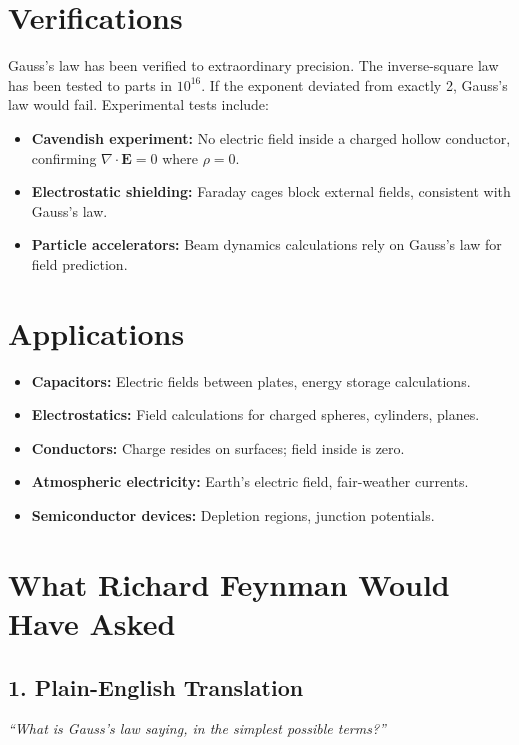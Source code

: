 \section*{Verifications}

Gauss's law has been verified to extraordinary precision. The inverse-square law has been tested to parts in $10^{16}$. If the exponent deviated from exactly 2, Gauss's law would fail. Experimental tests include:

\begin{itemize}
\item \textbf{Cavendish experiment:} No electric field inside a charged hollow conductor, confirming $\nabla \cdot \mathbf{E} = 0$ where $\rho = 0$.
\item \textbf{Electrostatic shielding:} Faraday cages block external fields, consistent with Gauss's law.
\item \textbf{Particle accelerators:} Beam dynamics calculations rely on Gauss's law for field prediction.
\end{itemize}

\section*{Applications}

\begin{itemize}
\item \textbf{Capacitors:} Electric fields between plates, energy storage calculations.
\item \textbf{Electrostatics:} Field calculations for charged spheres, cylinders, planes.
\item \textbf{Conductors:} Charge resides on surfaces; field inside is zero.
\item \textbf{Atmospheric electricity:} Earth's electric field, fair-weather currents.
\item \textbf{Semiconductor devices:} Depletion regions, junction potentials.
\end{itemize}

\section*{What Richard Feynman Would Have Asked}

\subsection*{1. Plain-English Translation}
\textit{``What is Gauss's law saying, in the simplest possible terms?''}

